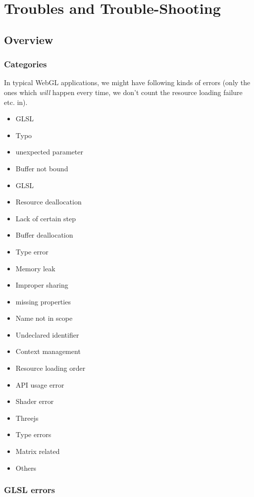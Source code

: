 \documentclass[]{article}
\begin{document}
\newpage
\section{Troubles and
Trouble-Shooting}\label{troubles-and-trouble-shooting}

\subsection{Overview}\label{overview}

\subsubsection{Categories}\label{categories}

In typical WebGL applications, we might have following kinds of errors
(only the ones which \emph{will} happen every time, we don't count the
resource loading failure etc. in).

\begin{itemize}
\itemsep1pt\parskip0pt
\item
  GLSL
\item
  Typo
\item
  unexpected parameter
\item
  Buffer not bound
\item
  GLSL
\item
  Resource deallocation
\item
  Lack of certain step
\item
  Buffer deallocation
\item
  Type error
\item
  Memory leak
\item
  Improper sharing
\item
  missing properties
\item
  Name not in scope
\item
  Undeclared identifier
\item
  Context management
\item
  Resource loading order
\item
  API usage error
\item
  Shader error
\item
  Threejs
\item
  Type errors
\item
  Matrix related
\item
  Others
\end{itemize}

\subsubsection{GLSL errors}\label{glsl-errors}
\end{document}
